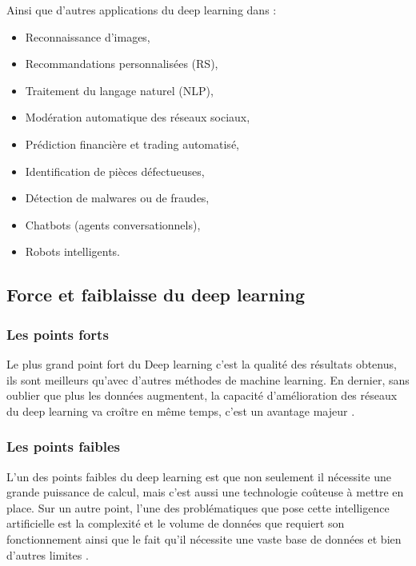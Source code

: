     Ainsi que d’autres applications du deep learning dans : \cite{ch2ref14}
    
    \begin{itemize}[label=•] %
    \setlength{\itemsep}{5pt}
        \item Reconnaissance d’images,
        \item Recommandations personnalisées (RS),
        \item Traitement du langage naturel (NLP),
        \item Modération automatique des réseaux sociaux,
        \item Prédiction financière et trading automatisé,
        \item Identification de pièces défectueuses,
        \item Détection de malwares ou de fraudes,
        \item Chatbots (agents conversationnels),
        \item Robots intelligents.
    \end{itemize}
    

    
    \subsection{Force et faiblaisse du deep learning}
    
        \subsubsection{Les points forts }
        \par Le plus grand point fort du Deep learning c'est la qualité des résultats obtenus, ils sont meilleurs qu'avec d'autres méthodes de machine learning. En dernier, sans oublier que plus les données augmentent, la capacité d'amélioration des réseaux du deep learning va croître en même temps, c'est un avantage majeur \cite{ch2ref9}.
        
        \subsubsection{Les points faibles }
        \par L'un des points faibles du deep learning est que non seulement il nécessite une grande puissance de calcul, mais c'est aussi une technologie coûteuse à mettre en place. Sur un autre point, l’une des problématiques que pose cette intelligence artificielle est la complexité et le volume de données que requiert son fonctionnement ainsi que le fait qu’il nécessite une vaste base de données et bien d'autres limites \cite{ch2ref9}.
        
